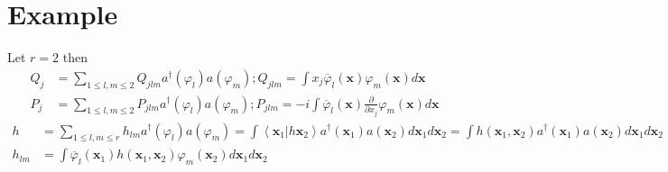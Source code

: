 \documentclass[aps,preprint]{revtex4}%
\begin{document}
\section{Example}

Let $r=2$ then
\begin{align}
Q_{j}  & =\sum_{1\leq l,m\leq2}Q_{jlm}a^{\dagger}\left(  \varphi_{l}\right)
a\left(  \varphi_{m}\right)  ;Q_{jlm}=\int x_{j}\overline{\varphi}_{l}\left(
\mathbf{x}\right)  \varphi_{m}\left(  \mathbf{x}\right)  d\mathbf{x}\\
P_{j}  & =\sum_{1\leq l,m\leq2}P_{jlm}a^{\dagger}\left(  \varphi_{l}\right)
a\left(  \varphi_{m}\right)  ;P_{jlm}=-i\int\overline{\varphi}_{l}\left(
\mathbf{x}\right)  \frac{\partial}{\partial x_{j}}\varphi_{m}\left(
\mathbf{x}\right)  d\mathbf{x}%
\end{align}
\begin{align}
h  & =\sum_{1\leq l,m\leq r}h_{lm}a^{\dagger}\left(  \varphi_{l}\right)
a\left(  \varphi_{m}\right)  =\int\left\langle \left.  \mathbf{x}%
_{1}\right\vert h\mathbf{x}_{2}\right\rangle a^{\dagger}\left(  \mathbf{x}%
_{1}\right)  a\left(  \mathbf{x}_{2}\right)  d\mathbf{x}_{1}d\mathbf{x}%
_{2}=\int h\left(  \mathbf{x}_{1},\mathbf{x}_{2}\right)  a^{\dagger}\left(
\mathbf{x}_{1}\right)  a\left(  \mathbf{x}_{2}\right)  d\mathbf{x}%
_{1}d\mathbf{x}_{2}\\
h_{lm}  & =\int\overline{\varphi}_{l}\left(  \mathbf{x}_{1}\right)  h\left(
\mathbf{x}_{1},\mathbf{x}_{2}\right)  \varphi_{m}\left(  \mathbf{x}%
_{2}\right)  d\mathbf{x}_{1}d\mathbf{x}_{2}%
\end{align}%
\end{document}
